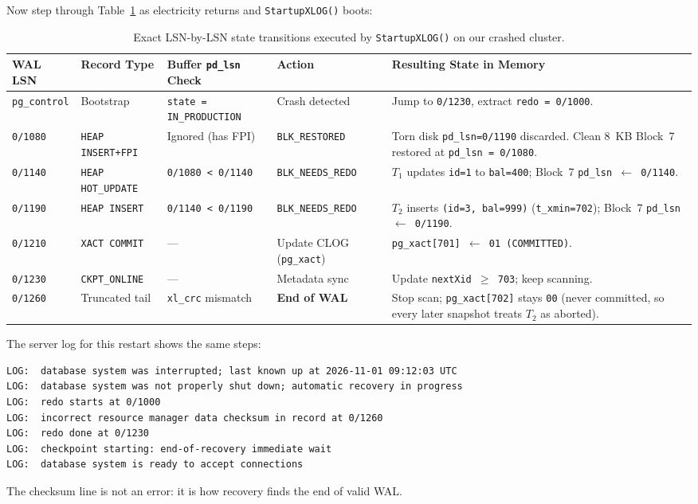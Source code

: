 Now step through Table~\ref{ch04:tab-recovery-walk} as electricity returns and \texttt{StartupXLOG()} boots:
\begin{table}[H]
\centering
\footnotesize
\begin{tabular}{@{}l>{\raggedright\arraybackslash}p{2.4cm}>{\raggedright\arraybackslash}p{2.7cm}>{\raggedright\arraybackslash}p{2.4cm}>{\raggedright\arraybackslash}p{4.6cm}@{}}
\toprule
\textbf{WAL LSN} & \textbf{Record Type} & \textbf{Buffer \texttt{pd\_lsn} Check} & \textbf{Action} & \textbf{Resulting State in Memory} \\
\midrule
\texttt{pg\_control} & Bootstrap & \texttt{state = IN\_\allowbreak PRODUCTION} & Crash detected & Jump to \texttt{0/1230}, extract \texttt{redo = 0/1000}. \\
\texttt{0/1080} & \texttt{HEAP INSERT+FPI} & Ignored (has FPI) & \texttt{BLK\_RESTORED} & Torn disk \texttt{pd\_lsn=0/1190} discarded. Clean 8~KB Block~7 restored at \texttt{pd\_lsn = 0/1080}. \\
\texttt{0/1140} & \texttt{HEAP HOT\_UPDATE} & \texttt{0/1080 < 0/1140} & \texttt{BLK\_NEEDS\_REDO} & $T_1$ updates \texttt{id=1} to \texttt{bal=400}; Block~7 \texttt{pd\_lsn $\gets$ 0/1140}. \\
\texttt{0/1190} & \texttt{HEAP INSERT} & \texttt{0/1140 < 0/1190} & \texttt{BLK\_NEEDS\_REDO} & $T_2$ inserts \texttt{(id=3, bal=999)} (\texttt{t\_xmin=702}); Block~7 \texttt{pd\_lsn $\gets$ 0/1190}. \\
\texttt{0/1210} & \texttt{XACT COMMIT} & --- & Update CLOG (\texttt{pg\_xact}) & \texttt{pg\_xact[701] $\gets$ 01 (COMMITTED)}. \\
\texttt{0/1230} & \texttt{CKPT\_ONLINE} & --- & Metadata sync & Update \texttt{nextXid $\ge$ 703}; keep scanning. \\
\texttt{0/1260} & Truncated tail & \texttt{xl\_crc} mismatch & \textbf{End of WAL} & Stop scan; \texttt{pg\_xact[702]} stays \texttt{00} (never committed, so every later snapshot treats $T_2$ as aborted). \\
\bottomrule
\end{tabular}
\caption{Exact LSN-by-LSN state transitions executed by \texttt{StartupXLOG()} on our crashed cluster.}
\label{ch04:tab-recovery-walk}
\end{table}

The server log for this restart shows the same steps:
\begin{lstlisting}[language=Plain]
LOG:  database system was interrupted; last known up at 2026-11-01 09:12:03 UTC
LOG:  database system was not properly shut down; automatic recovery in progress
LOG:  redo starts at 0/1000
LOG:  incorrect resource manager data checksum in record at 0/1260
LOG:  redo done at 0/1230
LOG:  checkpoint starting: end-of-recovery immediate wait
LOG:  database system is ready to accept connections
\end{lstlisting}
The checksum line is not an error: it is how recovery finds the end of valid WAL.

